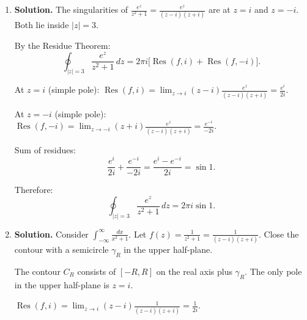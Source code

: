 \begin{enumerate}
Setting $z = 2$: $\frac{5}{(2)(1)} = 5/2$, so $C = 5/2$.

For $0 < |z| < 1$, expand $\frac{1}{z-1} = \frac{-1}{1-z} = -\sum_{n=0}^{\infty}z^n$ and $\frac{1}{z-2} = \frac{-1}{2}\cdot\frac{1}{1-z/2} = -\sum_{n=0}^{\infty}\frac{z^n}{2^{n+1}}$.

\begin{align*}
f(z) &= \frac{1}{2z} + (-2)\left(-\sum_{n=0}^{\infty}z^n\right) + \frac{5}{2}\left(-\sum_{n=0}^{\infty}\frac{z^n}{2^{n+1}}\right) \\
&= \frac{1}{2z} + 2\sum_{n=0}^{\infty}z^n - \frac{5}{2}\sum_{n=0}^{\infty}\frac{z^n}{2^{n+1}} \\
&= \frac{1}{2z} + \sum_{n=0}^{\infty}\left(2 - \frac{5}{2^{n+2}}\right)z^n.
\end{align*}

The only negative power is $z^{-1}$ with coefficient $1/2$. Therefore $z = 0$ is a \textbf{simple pole} with residue $1/2$.

\item \textbf{Solution.}
The singularities of $\frac{e^z}{z^2+1} = \frac{e^z}{(z-i)(z+i)}$ are at $z = i$ and $z = -i$. Both lie inside $|z| = 3$.

By the Residue Theorem:
\[
\oint_{|z|=3}\frac{e^z}{z^2+1}\,dz = 2\pi i\bigl[\operatorname{Res}(f, i) + \operatorname{Res}(f, -i)\bigr].
\]

At $z = i$ (simple pole): $\operatorname{Res}(f, i) = \lim_{z \to i}(z-i)\frac{e^z}{(z-i)(z+i)} = \frac{e^i}{2i}$.

At $z = -i$ (simple pole): $\operatorname{Res}(f, -i) = \lim_{z \to -i}(z+i)\frac{e^z}{(z-i)(z+i)} = \frac{e^{-i}}{-2i}$.

Sum of residues:
\[
\frac{e^i}{2i} + \frac{e^{-i}}{-2i} = \frac{e^i - e^{-i}}{2i} = \sin 1.
\]

Therefore:
\[
\oint_{|z|=3}\frac{e^z}{z^2+1}\,dz = 2\pi i \sin 1.
\]

\item \textbf{Solution.}
Consider $\int_{-\infty}^{\infty}\frac{dx}{x^2+1}$. Let $f(z) = \frac{1}{z^2+1} = \frac{1}{(z-i)(z+i)}$. Close the contour with a semicircle $\gamma_R$ in the upper half-plane.

The contour $C_R$ consists of $[-R, R]$ on the real axis plus $\gamma_R$. The only pole in the upper half-plane is $z = i$.

$\operatorname{Res}(f, i) = \lim_{z \to i}(z-i)\frac{1}{(z-i)(z+i)} = \frac{1}{2i}$.


\end{enumerate}
